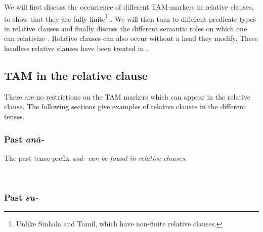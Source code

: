 We will first discuss the occurrence of different TAM-markers in relative clauses, to show that they are fully finite\footnote{Unlike Sinhala and Tamil, which have non-finite relative clauses.} . We will then turn to different predicate types in relative clauses  and finally discuss the different semantic roles on which one can relativize .
Relative clauses can also occur without a head they modify. These headless relative clauses have been treated in .


\subsection{TAM in the relative clause}\label{sec:cls:TAMintherelativeclause}
There are no restrictions on the TAM markers which can appear in the relative clause. The following sections give examples of relative clauses in the different tenses.

\subsubsection{Past \em anà-\em}\label{sec:cls:pastana}

The past tense prefix \em anà- \em can be found in relative clauses.

\\




\subsubsection{Past \em su-\em}\label{sec:cls:su}


